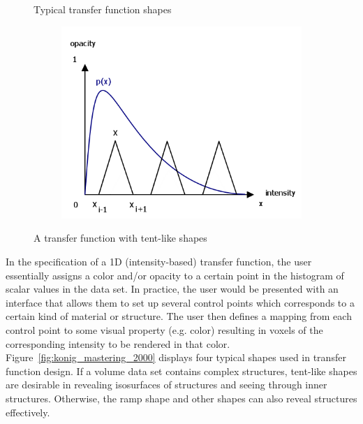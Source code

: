 \documentclass{egpubl}
\begin{document}
\begin{figure}
\begin{subfigure}{.2\textwidth}
	\end{subfigure}
	\caption{Typical transfer function shapes \cite{konig_mastering_2000}}
	\label{fig:konig_mastering_2000}
	\begin{subfigure}{.4\textwidth}
		\centering
		\includegraphics[width=1\textwidth]{drawing_distribution.png}
	\end{subfigure}
	\caption{A transfer function with tent-like shapes}
	\label{fig:drawing_distribution}
\end{figure}

In the specification of a 1D (intensity-based) transfer function, the user essentially assigns a color and/or opacity to a certain point in the histogram of scalar values in the data set. In practice, the user would be presented with an interface that allows them to set up several control points which corresponds to a certain kind of material or structure. The user then defines a mapping from each control point to some visual property (e.g. color) resulting in voxels of the corresponding intensity to be rendered in that color.
Figure~\ref{fig:konig_mastering_2000} displays four typical shapes used in transfer function design.
If a volume data set contains complex structures, tent-like shapes are desirable in revealing isosurfaces of structures and seeing through inner structures. Otherwise, the ramp shape and other shapes can also reveal structures effectively.%
\end{document}
